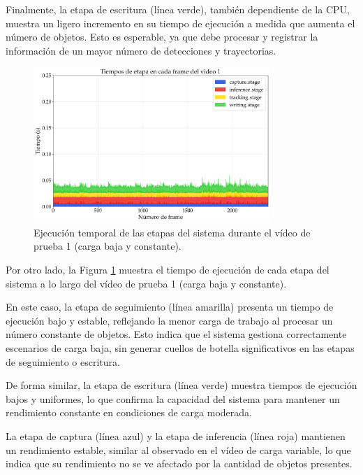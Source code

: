 \documentclass[11pt,spanish,listoffigures,listoftables]{tfgetsinf}
\begin{document}
Finalmente, la etapa de escritura (línea verde), también dependiente de la CPU, muestra un ligero incremento en su tiempo de ejecución a medida que aumenta el número de objetos. Esto es esperable, ya que debe procesar y registrar la información de un mayor número de detecciones y trayectorias.


\begin{figure}[H]
   \centering
   \includegraphics[width=0.8\textwidth]{excels/inferencia/cantidad_objetos/resultados/tiempo_etapa_cada_frame_video1/tiempo_etapa_video1.pdf}
   \caption[Ejecución temporal de las etapas del sistema durante el vídeo de prueba 1 (carga baja y constante)]{Ejecución temporal de las etapas del sistema durante el vídeo de prueba 1 (carga baja y constante).}
   \label{fig:tiempos_etapa_video1}
\end{figure}

Por otro lado, la Figura \ref{fig:tiempos_etapa_video1} muestra el tiempo de ejecución de cada etapa del sistema a lo largo del vídeo de prueba 1 (carga baja y constante).

En este caso, la etapa de seguimiento (línea amarilla) presenta un tiempo de ejecución bajo y estable, reflejando la menor carga de trabajo al procesar un número constante de objetos. Esto indica que el sistema gestiona correctamente escenarios de carga baja, sin generar cuellos de botella significativos en las etapas de seguimiento o escritura.

De forma similar, la etapa de escritura (línea verde) muestra tiempos de ejecución bajos y uniformes, lo que confirma la capacidad del sistema para mantener un rendimiento constante en condiciones de carga moderada.

La etapa de captura (línea azul) y la etapa de inferencia (línea roja) mantienen un rendimiento estable, similar al observado en el vídeo de carga variable, lo que indica que su rendimiento no se ve afectado por la cantidad de objetos presentes.
\end{document}
